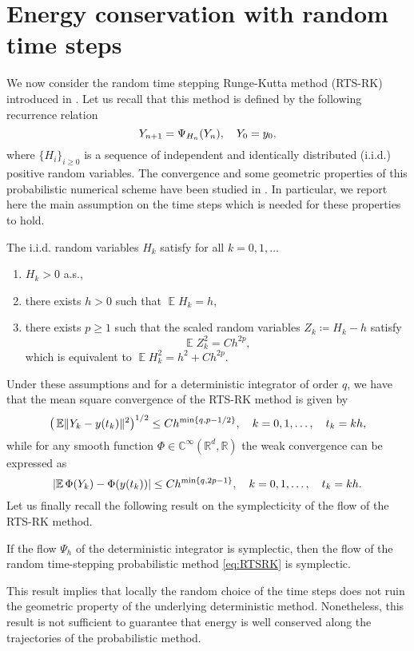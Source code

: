 \documentclass{siamart1116}
\numberwithin{theorem}{section}
\DeclarePairedDelimiter{\abs}{\lvert}{\rvert}
\DeclarePairedDelimiter{\norm}{\|}{\|}
\newcommand{\R}{\mathbb{R}}
\newcommand{\C}{\mathbb{C}}
\newcommand{\defeq}{\coloneqq}
\newcommand{\E}{\operatorname{\mathbb{E}}}
\newcommand{\corr}[1]{{\color{red}#1}}
\begin{document}
\section{Energy conservation with random time steps}\label{sec:RTSBEA} We now consider the random time stepping Runge-Kutta method (RTS-RK) introduced in \cite{AbG18}. Let us recall that this method is defined by the following recurrence relation
\begin{equation}\label{eq:RTSRK}
	Y_{n+1} = \Psi_{H_n}(Y_n), \quad Y_0 = y_0\corr{,}
\end{equation}
where $\{H_i\}_{i\geq 0}$ is a sequence of independent and identically distributed (i.i.d.) positive random variables. The convergence and some geometric properties of this probabilistic numerical scheme have been studied in \cite{AbG18}. In particular, we report here the main assumption on the time steps which is needed for these properties to hold.
\begin{assumption}\label{as:AssumptionH} The i.i.d. random variables $H_k$ satisfy for all $k = 0, 1, \ldots$
	\begin{enumerate}
		\item\label{as:hStrong_Pos} $H_k > 0$ a.s.,
		\item\label{as:hStrong_E} there exists $h > 0$ such that $\E H_k = h$,
		\item\label{as:hStrong_Var} there exists $p \geq 1$ such that the scaled random variables $Z_k \defeq H_k - h$ satisfy
		\begin{equation}
		\E Z_k^2 = Ch^{2p},
		\end{equation}
		which is equivalent to $\E H_k^2 = h^2 + Ch^{2p}$.
	\end{enumerate}
\end{assumption}
\corr{Under these assumptions and for a deterministic integrator of order $q$, we have that the mean square convergence of the RTS-RK method is given by
\begin{equation}
	\big(\E\norm{Y_k - y(t_k)}^2\big)^{1/2}	\leq Ch^{\min\{q, p-1/2\}}, \quad k = 0, 1, \ldots, \quad t_k = kh,
\end{equation} 
while for any smooth function $\Phi \in \C^{\infty}(\R^d, \R)$ the weak convergence can be expressed as
\begin{equation}
	\abs{\E \Phi(Y_k) - \Phi(y(t_k))} \leq Ch^{\min\{q, 2p-1\}}, \quad k = 0, 1, \ldots, \quad t_k = kh.
\end{equation}
Let us finally recall the following result on the symplecticity of the flow of the RTS-RK method.

\begin{lemma}\label{lem:SympRTSRK} If the flow $\Psi_h$ of the deterministic integrator is symplectic, then the flow of the random time-stepping probabilistic method \eqref{eq:RTSRK} is symplectic.
\end{lemma}
This result implies that locally the random choice of the time steps does not ruin the geometric property of the underlying deterministic method. Nonetheless, this result is not sufficient to guarantee that energy is well conserved along the trajectories of the probabilistic method.} 
\end{document}
